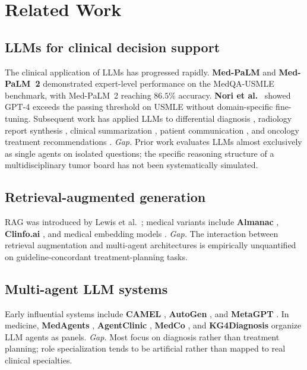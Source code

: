\documentclass[final, 11pt, 3p]{elsarticle}
\begin{document}
\section{Related Work}
\label{sec:related}

\subsection{LLMs for clinical decision support}
The clinical application of LLMs has progressed rapidly.
\textbf{Med-PaLM} \cite{Singhal2022} and \textbf{Med-PaLM~2}
\cite{Singhal2023} demonstrated expert-level performance on the
MedQA-USMLE benchmark, with Med-PaLM~2 reaching $86.5\%$ accuracy.
\textbf{Nori et al.}~\cite{Nori2023} showed GPT-4 exceeds the passing
threshold on USMLE without domain-specific fine-tuning. Subsequent
work has applied LLMs to differential diagnosis \cite{McDuff2024},
radiology report synthesis \cite{Liu2023Radiology}, clinical
summarization \cite{VanVeen2024}, patient communication
\cite{Ayers2023}, and oncology treatment recommendations
\cite{Sorin2024,Schulte2023,Benary2023}.
\emph{Gap.} Prior work evaluates LLMs almost exclusively as single
agents on isolated questions; the specific reasoning structure of a
multidisciplinary tumor board has not been systematically simulated.

\subsection{Retrieval-augmented generation}
RAG was introduced by Lewis et al.~\cite{Lewis2020}; medical variants
include \textbf{Almanac} \cite{Zakka2024}, \textbf{Clinfo.ai}
\cite{Lozano2023}, and medical embedding models
\cite{Jin2023,Xu2024,Jeong2024,Gao2024RAGSurvey}. \emph{Gap.} The
interaction between retrieval augmentation and multi-agent architectures
is empirically unquantified on guideline-concordant treatment-planning
tasks.

\subsection{Multi-agent LLM systems}
Early influential systems include \textbf{CAMEL} \cite{Li2023CAMEL},
\textbf{AutoGen} \cite{Wu2024AutoGen}, and \textbf{MetaGPT}
\cite{Hong2024MetaGPT}. In medicine, \textbf{MedAgents}
\cite{Tang2023MedAgents}, \textbf{AgentClinic}
\cite{Schmidgall2024AgentClinic}, \textbf{MedCo} \cite{Wei2024MedCo},
and \textbf{KG4Diagnosis} \cite{Liu2024KG4Diagnosis} organize LLM
agents as panels. \emph{Gap.} Most focus on diagnosis rather than
treatment planning; role specialization tends to be artificial rather
than mapped to real clinical specialties.
\end{document}
